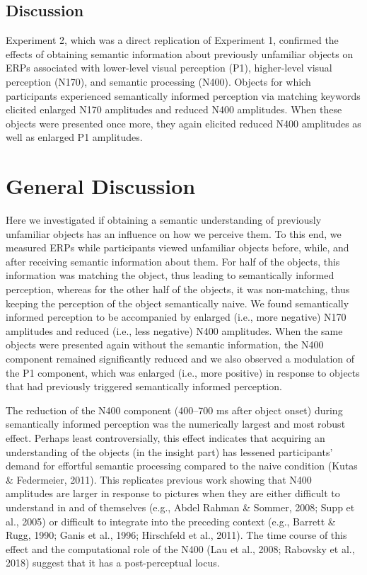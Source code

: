 \documentclass[
  english,
  man,floatsintext]{apa7}
\begin{document}
\hypertarget{discussion-1}{%
\subsection{Discussion}\label{discussion-1}}

Experiment 2, which was a direct replication of Experiment 1, confirmed the effects of obtaining semantic information about previously unfamiliar objects on ERPs associated with lower-level visual perception (P1), higher-level visual perception (N170), and semantic processing (N400). Objects for which participants experienced semantically informed perception via matching keywords elicited enlarged N170 amplitudes and reduced N400 amplitudes. When these objects were presented once more, they again elicited reduced N400 amplitudes as well as enlarged P1 amplitudes.

\hypertarget{general-discussion}{%
\section{General Discussion}\label{general-discussion}}

Here we investigated if obtaining a semantic understanding of previously unfamiliar objects has an influence on how we perceive them. To this end, we measured ERPs while participants viewed unfamiliar objects before, while, and after receiving semantic information about them. For half of the objects, this information was matching the object, thus leading to semantically informed perception, whereas for the other half of the objects, it was non-matching, thus keeping the perception of the object semantically naive. We found semantically informed perception to be accompanied by enlarged (i.e., more negative) N170 amplitudes and reduced (i.e., less negative) N400 amplitudes. When the same objects were presented again without the semantic information, the N400 component remained significantly reduced and we also observed a modulation of the P1 component, which was enlarged (i.e., more positive) in response to objects that had previously triggered semantically informed perception.

The reduction of the N400 component (400--700 ms after object onset) during semantically informed perception was the numerically largest and most robust effect. Perhaps least controversially, this effect indicates that acquiring an understanding of the objects (in the insight part) has lessened participants' demand for effortful semantic processing compared to the naive condition (Kutas \& Federmeier, 2011). This replicates previous work showing that N400 amplitudes are larger in response to pictures when they are either difficult to understand in and of themselves (e.g., Abdel Rahman \& Sommer, 2008; Supp et al., 2005) or difficult to integrate into the preceding context (e.g., Barrett \& Rugg, 1990; Ganis et al., 1996; Hirschfeld et al., 2011). The time course of this effect and the computational role of the N400 (Lau et al., 2008; Rabovsky et al., 2018) suggest that it has a post-perceptual locus.
\end{document}
